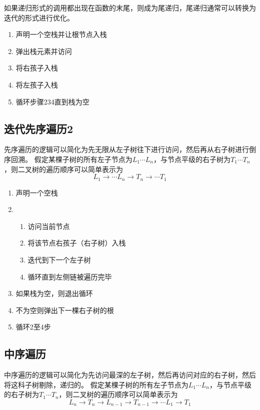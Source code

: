 \documentclass{article}
\begin{document}
如果递归形式的调用都出现在函数的末尾，则成为尾递归，尾递归通常可以转换为迭代的形式进行优化。
\begin{enumerate}
  \item 声明一个空栈并让根节点入栈
  \item 弹出栈元素并访问
  \item 将右孩子入栈
  \item 将左孩子入栈
  \item 循环步骤234直到栈为空
\end{enumerate}

\subsection{迭代先序遍历2}

先序遍历的逻辑可以简化为先无限从左子树往下进行访问，然后再从右子树进行倒序回溯。
假定某棵子树的所有左子节点为$L_1 \cdots L_n$，与节点平级的右子树为$T_1 \cdots T_n$，则二叉树的遍历顺序可以简单表示为
$$L_1 \rightarrow \cdots L_n \rightarrow T_n \rightarrow \cdots T_1$$

\begin{enumerate}
  \item 声明一个空栈
  \item \begin{enumerate}
          \item 访问当前节点
          \item 将该节点右孩子（右子树）入栈
          \item 迭代到下一个左子树
          \item 循环直到左侧链被遍历完毕
        \end{enumerate}
  \item 如果栈为空，则退出循环
  \item 不为空则弹出下一棵右子树的根
  \item 循环2至4步
\end{enumerate}

\subsection{中序遍历}

中序遍历的逻辑可以简化为先访问最深的左子树，然后再访问对应的右子树，然后将这科子树剔除，递归的。
假定某棵子树的所有左子节点为$L_1 \cdots L_n$，与节点平级的右子树为$T_1 \cdots T_n$，则二叉树的遍历顺序可以简单表示为
$$L_n \rightarrow T_n \rightarrow L_{n-1} \rightarrow T_{n-1} \rightarrow \cdots L_1 \rightarrow T_1$$
\end{document}
